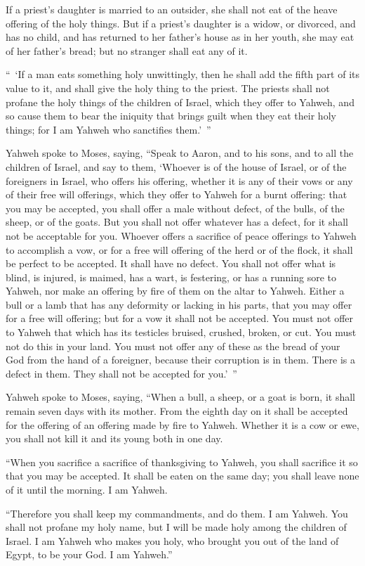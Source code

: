 {If a priest’s daughter is married to an outsider, she shall not eat of the heave offering of the holy things.
But if a priest’s daughter is a widow, or divorced, and has no child, and has returned to her father’s house as in her youth, she may eat of her father’s bread; but no stranger shall eat any of it.
\par }{\PP {}“ ‘If a man eats something holy unwittingly, then he shall add the fifth part of its value to it, and shall give the holy thing to the priest.
The priests shall not profane the holy things of the children of Israel, which they offer to Yahweh,
and so cause them to bear the iniquity that brings guilt when they eat their holy things; for I am Yahweh who sanctifies them.’ ”
\par }{\PP {}Yahweh spoke to Moses, saying,
“Speak to Aaron, and to his sons, and to all the children of Israel, and say to them, ‘Whoever is of the house of Israel, or of the foreigners in Israel, who offers his offering, whether it is any of their vows or any of their free will offerings, which they offer to Yahweh for a burnt offering:
that you may be accepted, you shall offer a male without defect, of the bulls, of the sheep, or of the goats.
But you shall not offer whatever has a defect, for it shall not be acceptable for you.
Whoever offers a sacrifice of peace offerings to Yahweh to accomplish a vow, or for a free will offering of the herd or of the flock, it shall be perfect to be accepted. It shall have no defect.
You shall not offer what is blind, is injured, is maimed, has a wart, is festering, or has a running sore to Yahweh, nor make an offering by fire of them on the altar to Yahweh.
Either a bull or a lamb that has any deformity or lacking in his parts, that you may offer for a free will offering; but for a vow it shall not be accepted.
You must not offer to Yahweh that which has its testicles bruised, crushed, broken, or cut. You must not do this in your land.
You must not offer any of these as the bread of your God from the hand of a foreigner, because their corruption is in them. There is a defect in them. They shall not be accepted for you.’ ”
\par }{\PP {}Yahweh spoke to Moses, saying,
“When a bull, a sheep, or a goat is born, it shall remain seven days with its mother. From the eighth day on it shall be accepted for the offering of an offering made by fire to Yahweh.
Whether it is a cow or ewe, you shall not kill it and its young both in one day.
\par }{\PP {}“When you sacrifice a sacrifice of thanksgiving to Yahweh, you shall sacrifice it so that you may be accepted.
It shall be eaten on the same day; you shall leave none of it until the morning. I am Yahweh.
\par }{\PP {}“Therefore you shall keep my commandments, and do them. I am Yahweh.
You shall not profane my holy name, but I will be made holy among the children of Israel. I am Yahweh who makes you holy,
who brought you out of the land of Egypt, to be your God. I am Yahweh.”

}
